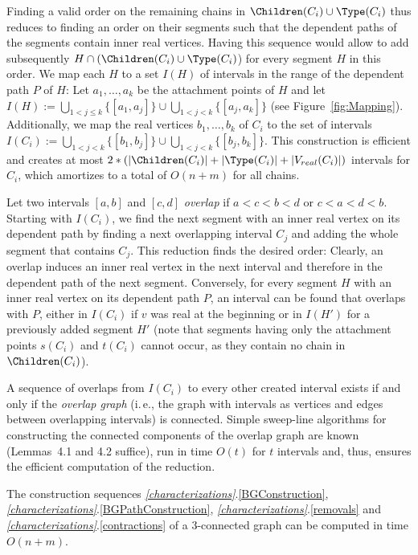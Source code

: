 Finding a valid order on the remaining chains in $\Children(C_i) \cup \Type(C_i)$ thus reduces to finding an order on their segments such that the dependent paths of the segments contain inner real vertices. Having this sequence would allow to add subsequently $H \cap (\Children(C_i) \cup \Type(C_i)$) for every segment $H$ in this order. We map each $H$ to a set $I(H)$ of intervals in the range of the dependent path $P$ of $H$: Let $a_1,\ldots,a_k$ be the attachment points of $H$ and let $I(H) := \bigcup_{1 < j \leq k} \{[a_1,a_j]\} \cup \bigcup_{1 < j < k} \{[a_j,a_k]\}$ (see Figure~\ref{fig:Mapping}). Additionally, we map the real vertices $b_1,\ldots,b_k$ of $C_i$ to the set of intervals $I(C_i) := \bigcup_{1 < j < k} \{[b_1,b_j]\} \cup \bigcup_{1 < j < k} \{[b_j,b_k]\}$. This construction is efficient and creates at most $2*(|\Children(C_i)|+|\Type(C_i)|+|V_{real}(C_i)|)$ intervals for $C_i$, which amortizes to a total of $O(n+m)$ for all chains.

Let two intervals $[a,b]$ and $[c,d]$ \emph{overlap} if $a < c < b < d$ or $c < a < d < b$. Starting with $I(C_i)$, we find the next segment with an inner real vertex on its dependent path by finding a next overlapping interval $C_j$ and adding the whole segment that contains $C_j$. This reduction finds the desired order: Clearly, an overlap induces an inner real vertex in the next interval and therefore in the dependent path of the next segment. Conversely, for every segment $H$ with an inner real vertex on its dependent path $P$, an interval can be found that overlaps with $P$, either in $I(C_i)$ if $v$ was real at the beginning or in $I(H')$ for a previously added segment $H'$ (note that segments having only the attachment points $s(C_i)$ and $t(C_i)$ cannot occur, as they contain no chain in $\Children(C_i)$).

A sequence of overlaps from $I(C_i)$ to every other created interval exists if and only if the \emph{overlap graph} (i.\,e., the graph with intervals as vertices and edges between overlapping intervals) is connected. Simple sweep-line algorithms for constructing the connected components of the overlap graph are known~\cite{Olariu1996} (Lemmas~4.1 and 4.2 suffice), run in time $O(t)$ for $t$ intervals and, thus, ensures the efficient computation of the reduction.

\begin{theorem}
The construction sequences \emph{\ref{characterizations}}.\eqref{BGConstruction}, \emph{\ref{characterizations}}.\eqref{BGPathConstruction}, \emph{\ref{characterizations}}.\eqref{removals} and \emph{\ref{characterizations}}.\eqref{contractions} of a $3$-connected graph can be computed in time $O(n+m)$.
\end{theorem}




